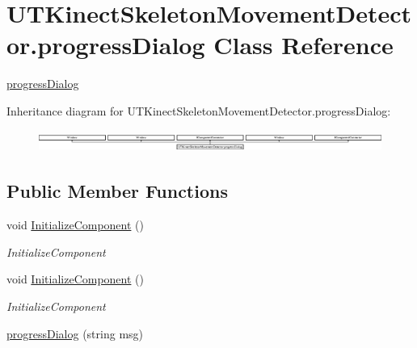 \hypertarget{class_u_t_kinect_skeleton_movement_detector_1_1progress_dialog}{\section{U\-T\-Kinect\-Skeleton\-Movement\-Detector.\-progress\-Dialog Class Reference}
\label{class_u_t_kinect_skeleton_movement_detector_1_1progress_dialog}
}


\hyperlink{class_u_t_kinect_skeleton_movement_detector_1_1progress_dialog}{progress\-Dialog}  


Inheritance diagram for U\-T\-Kinect\-Skeleton\-Movement\-Detector.\-progress\-Dialog\-:\begin{figure}[H]
\begin{center}
\leavevmode
\includegraphics[height=0.713376cm]{class_u_t_kinect_skeleton_movement_detector_1_1progress_dialog}
\end{center}
\end{figure}
\subsection*{Public Member Functions}
\begin{DoxyCompactItemize}
\item 
void \hyperlink{class_u_t_kinect_skeleton_movement_detector_1_1progress_dialog_ad67bc7d8762e3496e8d812bdea3946ff}{Initialize\-Component} ()
\begin{DoxyCompactList}\small\item\em Initialize\-Component \end{DoxyCompactList}\item 
void \hyperlink{class_u_t_kinect_skeleton_movement_detector_1_1progress_dialog_ad67bc7d8762e3496e8d812bdea3946ff}{Initialize\-Component} ()
\begin{DoxyCompactList}\small\item\em Initialize\-Component \end{DoxyCompactList}\item 
\hyperlink{class_u_t_kinect_skeleton_movement_detector_1_1progress_dialog_ab99cb0504b3fb6d18cedcaa82c627f4c}{progress\-Dialog} (string msg)
\end{DoxyCompactItemize}


